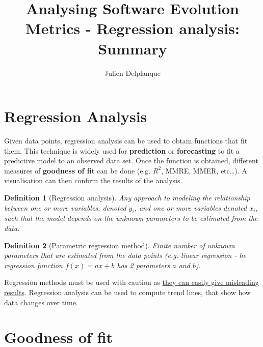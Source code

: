 \documentclass[a4paper,11pt]{report}
\title{Analysing Software Evolution Metrics - Regression analysis: Summary}
\author{Julien Delplanque}
\newtheorem{definition}{Definition}
\begin{document}
\maketitle
\newpage

\section{Regression Analysis}
Given data points, regression analysis can be used to obtain functions that fit
them. This technique is widely used for \textbf{prediction} or
\textbf{forecasting} to fit a predictive model to an observed data set. Once
the function is obtained, different measures of \textbf{goodness of fit} can be
done (e.g. $R^2$, MMRE, MMER, etc\dots). A visualisation can then confirm the
results of the analysis.

\begin{definition}[Regression analysis]
Any approach to modeling the relationship between one or more variables, denoted
$y_i$, and one or more variables denoted $x_i$, such that the model depends on
the unknown parameters to be estimated from the data.
\end{definition}

\begin{definition}[Parametric regression method]
Finite number of unknown parameters that are estimated from the data points
(e.g. linear regression - he regression function $f(x)=ax+b$ has 2 parameters
$a$ and $b$).
\end{definition}

Regression methods must be used with caution as \underline{they can easily give
misleading results}. Regression analysis can be used to compute trend lines,
that show how data changes over time.

\section{Goodness of fit}
\end{document}
